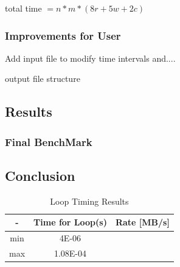 \documentclass[]{article}%
\begin{document}
total time $=n*m*(8r+5w+2c)$






\subsubsection{Improvements for User}
Add input file to modify time intervals and....

output file structure


\subsection{Results}

\subsubsection{Final BenchMark}



\subsection{Conclusion}


\begin{table}[ht]
\caption{Loop Timing Results}
\centering
\begin{tabular}{c c c}
\hline\hline
 - & Time for Loop(s) & Rate [MB/s]\\ [0.5ex] 
\hline
min & 4E-06 & \\ 
max & 1.08E-04 & \\

\hline
\end{tabular}
\label{table:norm_high}
\end{table} 

\end{document}
